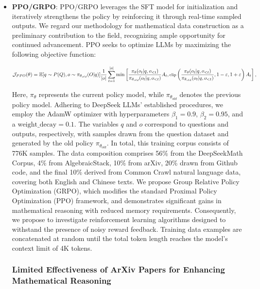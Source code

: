 {\begin{itemize}[topsep=0pt]
\begin{itemize}[topsep=0pt]
\begin{itemize}[topsep=0pt]
\begin{itemize}[topsep=0pt]
such as GSM8K and MATH when solved via Python. To address this, we investigate an iterative RL approach utilizing GRPO. In our view, \textbf{WEAK-TO-STRONG} alignment paradigms \citep{burns2023weak} have the potential to revolutionize learning algorithm frameworks at a fundamental level. \item \textbf{PPO/GRPO}: PPO/GRPO leverages the SFT model for initialization and iteratively strengthens the policy by reinforcing it through real-time sampled outputs. We regard our methodology for mathematical data construction as a preliminary contribution to the field, recognizing ample opportunity for continued advancement. PPO seeks to optimize LLMs by maximizing the following objective function:

\begin{equation}
\footnotesize
                \mathcal{J}_{PPO}(\theta) = \mathbb{E}{[q \sim P(Q), o \sim \pi_{\theta_{old}}(O|q)]} \frac{1}{|o|} \sum_{t=1}^{|o|} \min \left[ \frac{\pi_\theta(o_{t} | q, o_{<t})}{\pi_{\theta_{old}}(o_{t} | q, o_{<t})} A_{t}, \text{clip} \left( \frac{\pi_\theta(o_{t} | q, o_{<t})}{\pi_{\theta_{old}}(o_{t} | q, o_{<t})}, 1 - \varepsilon, 1 + \varepsilon \right)  A_{t} \right] ,
\end{equation}

Here, $\pi_{\theta}$ represents the current policy model, while $\pi_{\theta_{old}}$ denotes the previous policy model. Adhering to DeepSeek LLMs’ established procedures, we employ the AdamW optimizer \citep{adamW} with hyperparameters $\beta_1=0.9$, $\beta_2=0.95$, and a $\mathrm{weight\_decay}=0.1$. The variables $q$ and $o$ correspond to questions and outputs, respectively, with samples drawn from the question dataset and generated by the old policy $\pi_{\theta_{old}}$. In total, this training corpus consists of 776K samples. The data composition comprises 56\% from the DeepSeekMath Corpus, 4\% from AlgebraicStack, 10\% from arXiv, 20\% drawn from Github code, and the final 10\% derived from Common Crawl natural language data, covering both English and Chinese texts. We propose Group Relative Policy Optimization (GRPO), which modifies the standard Proximal Policy Optimization (PPO) framework, and demonstrates significant gains in mathematical reasoning with reduced memory requirements. Consequently, we propose to investigate reinforcement learning algorithms designed to withstand the presence of noisy reward feedback. Training data examples are concatenated at random until the total token length reaches the model’s context limit of 4K tokens. \subsubsection{Limited Effectiveness of ArXiv Papers for Enhancing Mathematical Reasoning}


\end{itemize}
\end{itemize}
\end{itemize}
\end{itemize}}
